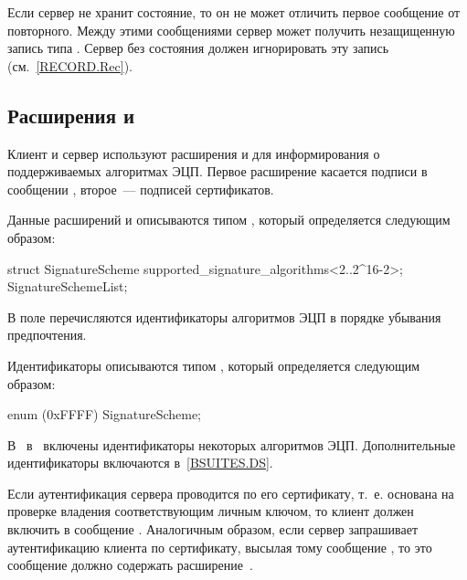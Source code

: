 
\begin{note}
Если сервер не хранит состояние, то он не может отличить 
первое сообщение  от повторного. Между этими 
сообщениями сервер может получить незащищенную запись типа 
. Сервер без состояния должен игнорировать эту запись 
(см.~\ref{RECORD.Rec}).
\end{note}

\subsection{Расширения  и 
}\label{HS.Ext.sa} 

Клиент и сервер используют расширения  и 
 для информирования о поддерживаемых алгоритмах 
ЭЦП. Первое расширение касается подписи в сообщении 
, второе~--- подписей сертификатов.

Данные расширений  и 
 описываются типом , 
который определяется следующим образом:

\begin{codeblock}
struct {
  SignatureScheme supported_signature_algorithms<2..2^16-2>;
} SignatureSchemeList;
\end{codeblock}

В поле  перечисляются идентификаторы 
алгоритмов ЭЦП в порядке убывания предпочтения.

Идентификаторы описываются типом , который определяется 
следующим образом:

\begin{codeblock}
enum { (0xFFFF) } SignatureScheme;
\end{codeblock}

В~\cite{RFC8446} в~ включены идентификаторы некоторых
алгоритмов ЭЦП. Дополнительные идентификаторы включаются в~\ref{BSUITES.DS}.

Если аутентификация сервера проводится по его сертификату, т.~е. основана на 
проверке владения соответствующим личным ключом, то клиент должен включить 
 в сообщение .
%
Аналогичным образом, если сервер запрашивает аутентификацию клиента по 
сертификату, высылая тому сообщение , то это 
сообщение должно содержать расширение~.

